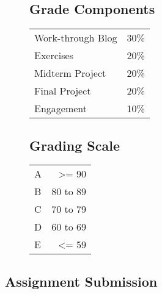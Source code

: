 \documentclass[
  letterpaper,
  DIV=11,
  numbers=noendperiod]{scrartcl}
\begin{document}
\begin{figure}

\begin{minipage}[t]{0.50\linewidth}

{\centering 

\hypertarget{grade-components}{%
\subsection{Grade Components}\label{grade-components}}

\begin{longtable}[]{@{}lr@{}}
\toprule()
\endhead
Work-through Blog & 30\% \\
Exercises & 20\% \\
Midterm Project & 20\% \\
Final Project & 20\% \\
Engagement & 10\% \\
\bottomrule()
\end{longtable}

}

\end{minipage}%
%
\begin{minipage}[t]{0.50\linewidth}

{\centering 

\hypertarget{grading-scale}{%
\subsection{Grading Scale}\label{grading-scale}}

\begin{longtable}[]{@{}lr@{}}
\toprule()
\endhead
A & \textgreater= 90 \\
B & 80 to 89 \\
C & 70 to 79 \\
D & 60 to 69 \\
E & \textless= 59 \\
\bottomrule()
\end{longtable}

}

\end{minipage}%

\end{figure}

\hypertarget{assignment-submission}{%
\subsection{Assignment Submission}\label{assignment-submission}}
\end{document}
